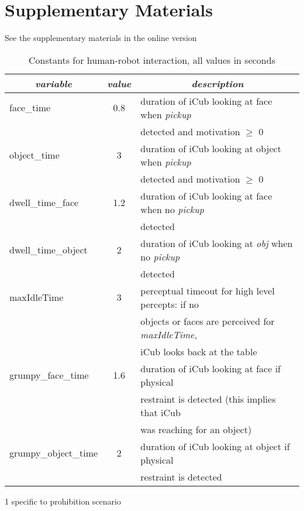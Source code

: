 \clearpage
\appendix

\section{Supplementary Materials}

\begin{printonly}
  See the supplementary materials in the online version
\end{printonly}

\begin{screenonly}
  
\begin{table}[h]
  \caption{Constants for human-robot interaction, all values in seconds}
  \label{tbl_time_constants}
  \begin{threeparttable}
    \begin{tabular}{lcl}
      \hline
      \multicolumn{1}{c}{\textit{variable}} & \multicolumn{1}{c}{\textit{value}} & \multicolumn{1}{c}{\textit{description}}\\
      \hline
      face\_time & 0.8 & duration of iCub looking at face when \textit{pickup}\\
      & & detected and motivation $\ge$ 0\\
      \hline
      object\_time & 3 & duration of iCub looking at object when \textit{pickup}\\
      & &  detected and motivation $\ge$ 0\\
      \hline
      dwell\_time\_face & 1.2 & duration of iCub looking at face when no \textit{pickup}\\
      & &  detected\\
      \hline
      dwell\_time\_object & 2 & duration of iCub looking at \textit{obj} when no \textit{pickup}\\
      & &  detected\\
      \hline
      maxIdleTime & 3 & perceptual timeout for high level percepts: if no\\
      & & objects or faces are perceived for \textit{maxIdleTime},\\
      & &  iCub looks back at the table\\
      \hline
      grumpy\_face\_time\tnote{1} & 1.6 & duration of iCub looking at face if physical\\
      & & restraint is detected (this implies that iCub\\
      & & was reaching for an object)\\
      \hline
      grumpy\_object\_time\tnote{1} & 2 & duration of iCub looking at object if physical\\
      & & restraint is detected\\
      \hline
    \end{tabular}
    \begin{tablenotes}
    \item[1] specific to prohibition scenario
    \end{tablenotes}
  \end{threeparttable}
\end{table}


\end{screenonly}

